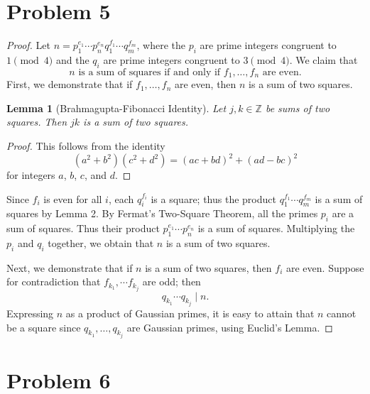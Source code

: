 \documentclass[11pt]{article}
\newtheorem{lemma}{Lemma}
\begin{document}
\section{Problem 5}
\begin{proof}
  Let $n = p_{1}^{e_{1}} \cdots p_{n}^{e_{n}} q_{1}^{f_{1}} \cdots q_{m}^{f_{m}}$, where the $p_{i}$ are prime integers congruent to $1 \pmod{4}$ and the $q_{i}$ are prime integers congruent to $3 \pmod{4}$. We claim that
  \[
    \boxed{\text{$n$ is a sum of squares if and only if $f_{1}, \ldots, f_{n}$ are even}}.
  \]
  First, we demonstrate that if $f_{1}, \ldots, f_{n}$ are even, then $n$ is a sum of two squares.
  
  \begin{adjustwidth}{0.5cm}{}
    \begin{lemma}[Brahmagupta-Fibonacci Identity]
      Let $j, k \in \mathbb{Z}$ be sums of two squares. Then $jk$ is a sum of two squares.
    \end{lemma}
    \begin{proof}
      This follows from the identity
      \[
        (a^{2} + b^{2})(c^{2} + d^{2}) = (ac + bd)^{2} + (ad - bc)^{2}
      \]
      for integers $a$, $b$, $c$, and $d$.
    \end{proof}
  \end{adjustwidth}
  Since $f_{i}$ is even for all $i$, each $q_{i}^{f_{i}}$ is a square; thus the product $q_{1}^{f_{1}} \cdots q_{m}^{f_{m}}$ is a sum of squares by Lemma 2. By Fermat's Two-Square Theorem, all the primes $p_{i}$ are a sum of squares. Thus their product $p_{1}^{e_{1}} \cdots p_{n}^{e_{n}}$ is a sum of squares. Multiplying the $p_{i}$ and $q_{i}$ together, we obtain that $n$ is a sum of two squares.
  
  Next, we demonstrate that if $n$ is a sum of two squares, then $f_{i}$ are even. Suppose for contradiction that $f_{k_{1}}, \cdots f_{k_{j}}$ are odd; then
  \[
    q_{k_{1}} \cdots q_{k_{j}} \mid n.
  \]
  Expressing $n$ as a product of Gaussian primes, it is easy to attain that $n$ cannot be a square since $q_{k_{1}}, \ldots, q_{k_{j}}$ are Gaussian primes, using Euclid's Lemma.
\end{proof}


\section{Problem 6}

\end{document}
